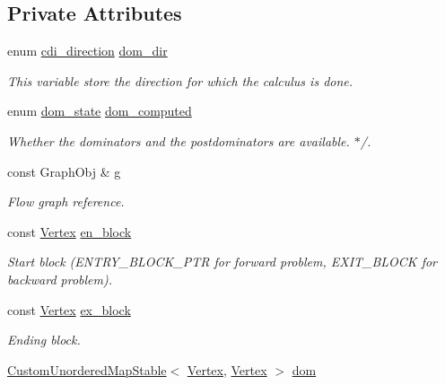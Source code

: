 \subsection*{Private Attributes}
\begin{DoxyCompactItemize}
\item 
enum \hyperlink{classdominance_a983b27e93af6a5d375c01d81c2c30c40}{cdi\+\_\+direction} \hyperlink{classdominance_a9d1cc666f009059229e10b8cf599ae9c}{dom\+\_\+dir}
\begin{DoxyCompactList}\small\item\em This variable store the direction for which the calculus is done. \end{DoxyCompactList}\item 
enum \hyperlink{classdominance_a0c204e06a7b2ea3dc3594722523ab47e}{dom\+\_\+state} \hyperlink{classdominance_aed13361be369ca9b539641979e2e8dff}{dom\+\_\+computed}
\begin{DoxyCompactList}\small\item\em Whether the dominators and the postdominators are available. $\ast$/. \end{DoxyCompactList}\item 
const Graph\+Obj \& \hyperlink{classdominance_ac30e4244fe4bf2383deb9a2ef623770e}{g}
\begin{DoxyCompactList}\small\item\em Flow graph reference. \end{DoxyCompactList}\item 
const \hyperlink{classdominance_acc73faf26e73171b15fd0ff6c63ca393}{Vertex} \hyperlink{classdominance_a11217422f64f86c44f61c5502fff5980}{en\+\_\+block}
\begin{DoxyCompactList}\small\item\em Start block (E\+N\+T\+R\+Y\+\_\+\+B\+L\+O\+C\+K\+\_\+\+P\+TR for forward problem, E\+X\+I\+T\+\_\+\+B\+L\+O\+CK for backward problem). \end{DoxyCompactList}\item 
const \hyperlink{classdominance_acc73faf26e73171b15fd0ff6c63ca393}{Vertex} \hyperlink{classdominance_aefb0058739be971542af222ee24d8c72}{ex\+\_\+block}
\begin{DoxyCompactList}\small\item\em Ending block. \end{DoxyCompactList}\item 
\hyperlink{custom__map_8hpp_a7314a7df1cdb3a3acf478ab86e95c226}{Custom\+Unordered\+Map\+Stable}$<$ \hyperlink{classdominance_acc73faf26e73171b15fd0ff6c63ca393}{Vertex}, \hyperlink{classdominance_acc73faf26e73171b15fd0ff6c63ca393}{Vertex} $>$ \hyperlink{classdominance_a703762a55e6857d60e37ea71790b84dd}{dom}

\end{DoxyCompactItemize}
